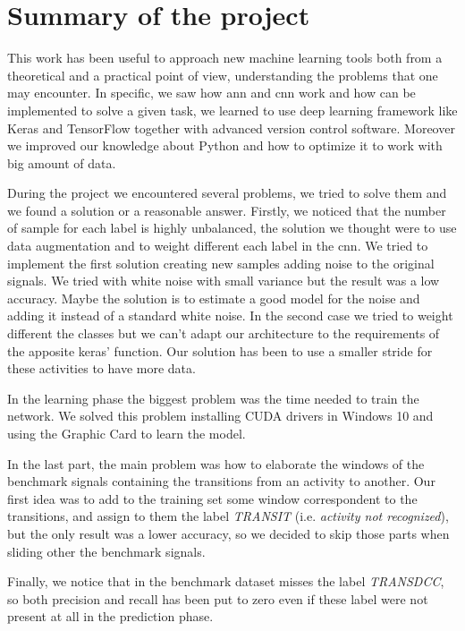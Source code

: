 
\section{Summary of the project}
\label{sec:summary}
This work has been useful to approach new machine learning tools both from a theoretical and a practical point of view, understanding the problems that one may encounter.
In specific, we saw how \gls{ann} and \gls{cnn} work and how can be implemented to solve a given task, we learned to use deep learning framework like Keras and TensorFlow together with advanced version control software. Moreover we improved our knowledge about Python and how to optimize it to work with big amount of data.

During the project we encountered several problems, we tried to solve them and we found a solution or a reasonable answer.
Firstly, we noticed that the number of sample for each label is highly unbalanced, the solution we thought were to use data augmentation and to weight different each label in the \gls{cnn}. We tried to implement the first solution creating new samples adding noise to the original signals. We tried with white noise with small variance but the result was a low accuracy. Maybe the solution is to estimate a good model for the noise and adding it instead of a standard white noise.
In the second case we tried to weight different the classes but we can't adapt our architecture to the requirements of the apposite keras' function.
Our solution has been to use a smaller stride for these activities to have more data.

In the learning phase the biggest problem was the time needed to train the network. We solved this problem installing CUDA drivers in Windows 10 and using the Graphic Card to learn the model.

In the last part, the main problem was how to elaborate the windows of the benchmark signals containing the transitions from an activity to another. Our first idea was to add to the training set some window correspondent to the transitions, and assign to them the label \textit{TRANSIT} (i.e. \textit{activity not recognized}), but the only result was a lower accuracy, so we decided to skip those parts when sliding other the benchmark signals.

Finally, we notice that in the benchmark dataset misses the label \textit{TRANSDCC}, so both precision and recall has been put to zero even if these label were not present at all in the prediction phase.

